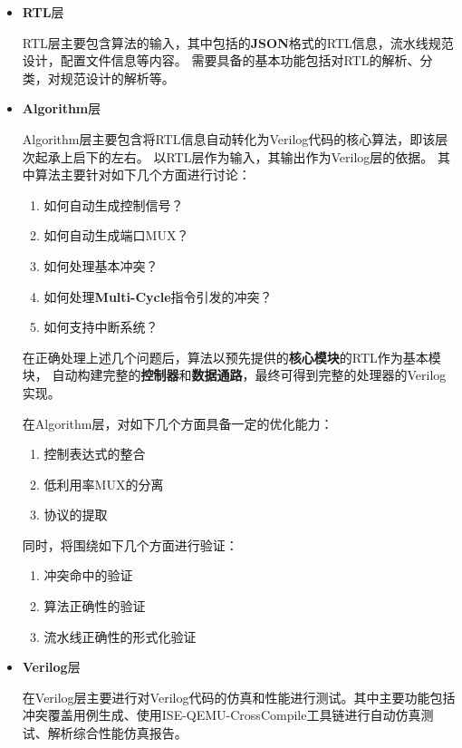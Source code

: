 \documentclass[hyperref,UTF8]{ctexart}
\theoremstyle{definition}
\theoremstyle{remark}
\numberwithin{equation}{subsection}
\newcommand{\Emph}{\textbf}
\begin{document}
	\begin{itemize}
	
		\item \Emph{RTL}层
		
		RTL层主要包含算法的输入，其中包括的\Emph{JSON}格式的RTL信息，流水线规范设计，配置文件信息等内容。
		需要具备的基本功能包括对RTL的解析、分类，对规范设计的解析等。
		
		\item \Emph{Algorithm}层
		
		Algorithm层主要包含将RTL信息自动转化为Verilog代码的核心算法，即该层次起承上启下的左右。
		以RTL层作为输入，其输出作为Verilog层的依据。
		其中算法主要针对如下几个方面进行讨论：
		\begin{enumerate}[(1)]
			
			\item 如何自动生成控制信号？
			
			\item 如何自动生成端口MUX？
			
			\item 如何处理基本冲突？
			
			\item 如何处理\Emph{Multi-Cycle}指令引发的冲突？
			
			\item 如何支持中断系统？
			
		\end{enumerate}
		在正确处理上述几个问题后，算法以预先提供的\Emph{核心模块}的RTL作为基本模块，
		自动构建完整的\Emph{控制器}和\Emph{数据通路}，最终可得到完整的处理器的Verilog实现。
		
		在Algorithm层，对如下几个方面具备一定的优化能力：
		\begin{enumerate}[(1)]
		
			\item 控制表达式的整合
			
			\item 低利用率MUX的分离
			
			\item 协议的提取
			
		\end{enumerate}
		同时，将围绕如下几个方面进行验证：
		\begin{enumerate}[(1)]
		
			\item 冲突命中的验证
			
			\item 算法正确性的验证
			
			\item 流水线正确性的形式化验证
			
		\end{enumerate}
		
		
		\item \Emph{Verilog}层
		
		在Verilog层主要进行对Verilog代码的仿真和性能进行测试。其中主要功能包括
		冲突覆盖用例生成、使用ISE-QEMU-CrossCompile工具链进行自动仿真测试、解析综合性能仿真报告。
		
	
	\end{itemize}
		
\end{document}
